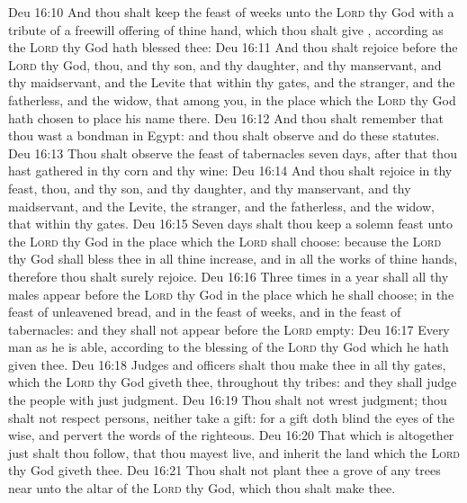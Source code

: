 \vs Deu 16:10 And thou shalt keep the feast of weeks unto the \textsc{Lord} thy God with a tribute of a freewill offering of thine hand, which thou shalt give , according as the \textsc{Lord} thy God hath blessed thee:
\vs Deu 16:11 And thou shalt rejoice before the \textsc{Lord} thy God, thou, and thy son, and thy daughter, and thy manservant, and thy maidservant, and the Levite that  within thy gates, and the stranger, and the fatherless, and the widow, that  among you, in the place which the \textsc{Lord} thy God hath chosen to place his name there.
\vs Deu 16:12 And thou shalt remember that thou wast a bondman in Egypt: and thou shalt observe and do these statutes.
\vs Deu 16:13 Thou shalt observe the feast of tabernacles seven days, after that thou hast gathered in thy corn and thy wine:
\vs Deu 16:14 And thou shalt rejoice in thy feast, thou, and thy son, and thy daughter, and thy manservant, and thy maidservant, and the Levite, the stranger, and the fatherless, and the widow, that  within thy gates.
\vs Deu 16:15 Seven days shalt thou keep a solemn feast unto the \textsc{Lord} thy God in the place which the \textsc{Lord} shall choose: because the \textsc{Lord} thy God shall bless thee in all thine increase, and in all the works of thine hands, therefore thou shalt surely rejoice.
\vs Deu 16:16 Three times in a year shall all thy males appear before the \textsc{Lord} thy God in the place which he shall choose; in the feast of unleavened bread, and in the feast of weeks, and in the feast of tabernacles: and they shall not appear before the \textsc{Lord} empty:
\vs Deu 16:17 Every man  as he is able, according to the blessing of the \textsc{Lord} thy God which he hath given thee.
\vs Deu 16:18 Judges and officers shalt thou make thee in all thy gates, which the \textsc{Lord} thy God giveth thee, throughout thy tribes: and they shall judge the people with just judgment.
\vs Deu 16:19 Thou shalt not wrest judgment; thou shalt not respect persons, neither take a gift: for a gift doth blind the eyes of the wise, and pervert the words of the righteous.
\vs Deu 16:20 That which is altogether just shalt thou follow, that thou mayest live, and inherit the land which the \textsc{Lord} thy God giveth thee.
\vs Deu 16:21 Thou shalt not plant thee a grove of any trees near unto the altar of the \textsc{Lord} thy God, which thou shalt make thee.
